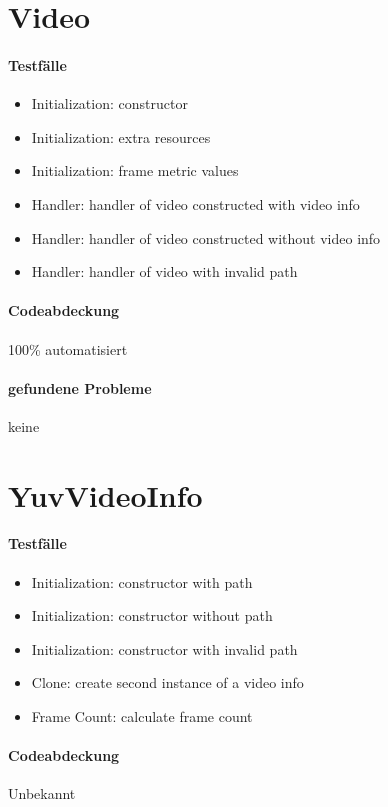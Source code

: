 \section{Video}
\paragraph*{Testfälle}
\begin{itemize}
\item Initialization: constructor
\item Initialization: extra resources
\item Initialization: frame metric values
\item Handler: handler of video constructed with video info
\item Handler: handler of video constructed without video info
\item Handler: handler of video with invalid path
\end{itemize}

\paragraph*{Codeabdeckung}
100\% automatisiert

\paragraph*{gefundene Probleme}
keine

\section{YuvVideoInfo}
\paragraph*{Testfälle}
\begin{itemize}
\item Initialization: constructor with path
\item Initialization: constructor without path
\item Initialization: constructor with invalid path
\item Clone: create second instance of a video info
\item Frame Count: calculate frame count
\end{itemize}

\paragraph*{Codeabdeckung}
Unbekannt

